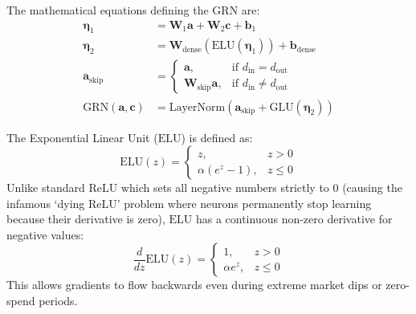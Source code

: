 \documentclass[11pt,a4paper]{article}
\begin{document}
The mathematical equations defining the GRN are:
\begin{align}
    \boldsymbol{\eta}_1 &= \mathbf{W}_1 \mathbf{a} + \mathbf{W}_2 \mathbf{c} + \mathbf{b}_1 \\
    \boldsymbol{\eta}_2 &= \mathbf{W}_{\text{dense}} \left(\mathrm{ELU}(\boldsymbol{\eta}_1)\right) + \mathbf{b}_{\text{dense}} \\
    \mathbf{a}_{\text{skip}} &= \begin{cases} \mathbf{a}, & \text{if } d_{\text{in}} = d_{\text{out}} \\ \mathbf{W}_{\text{skip}} \mathbf{a}, & \text{if } d_{\text{in}} \ne d_{\text{out}} \end{cases} \\
    \mathrm{GRN}(\mathbf{a}, \mathbf{c}) &= \mathrm{LayerNorm}\left(\mathbf{a}_{\text{skip}} + \mathrm{GLU}(\boldsymbol{\eta}_2)\right)
\end{align}

\begin{intuitionbox}
The Exponential Linear Unit ($\mathrm{ELU}$) is defined as:
\begin{equation}
    \mathrm{ELU}(z) = \begin{cases} z, & z > 0 \\ \alpha(e^z - 1), & z \le 0 \end{cases}
\end{equation}
Unlike standard $\mathrm{ReLU}$ which sets all negative numbers strictly to $0$ (causing the infamous `dying ReLU' problem where neurons permanently stop learning because their derivative is zero), $\mathrm{ELU}$ has a continuous non-zero derivative for negative values:
\begin{equation}
    \frac{d}{dz}\mathrm{ELU}(z) = \begin{cases} 1, & z > 0 \\ \alpha e^z, & z \le 0 \end{cases}
\end{equation}
This allows gradients to flow backwards even during extreme market dips or zero-spend periods.
\end{intuitionbox}
\end{document}
